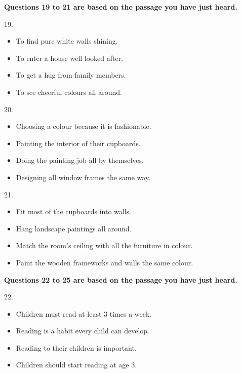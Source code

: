 \documentclass[UTF8,11pt]{ctexart}
\begin{document}
\textbf{Questions 19 to 21 are based on the passage you have just heard.}


19.


\begin{itemize}[leftmargin=2em,itemsep=.2em,topsep=.4em]\item[A.] To find pure white walls shining.
\item[B.] To enter a house well looked after.
\item[C.] To get a hug from family members.
\item[D.] To see cheerful colours all around.
\end{itemize}

20.


\begin{itemize}[leftmargin=2em,itemsep=.2em,topsep=.4em]\item[A.] Choosing a colour because it is fashionable.
\item[B.] Painting the interior of their cupboards.
\item[C.] Doing the painting job all by themselves.
\item[D.] Designing all window frames the same way.
\end{itemize}

21.


\begin{itemize}[leftmargin=2em,itemsep=.2em,topsep=.4em]\item[A.] Fit most of the cupboards into walls.
\item[B.] Hang landscape paintings all around.
\item[C.] Match the room's ceiling with all the furniture in colour.
\item[D.] Paint the wooden frameworks and walls the same colour.
\end{itemize}

\textbf{Questions 22 to 25 are based on the passage you have just heard.}


22.


\begin{itemize}[leftmargin=2em,itemsep=.2em,topsep=.4em]\item[A.] Children must read at least 3 times a week.
\item[B.] Reading is a habit every child can develop.
\item[C.] Reading to their children is important.
\item[D.] Children should start reading at age 3.
\end{itemize}
\end{document}
